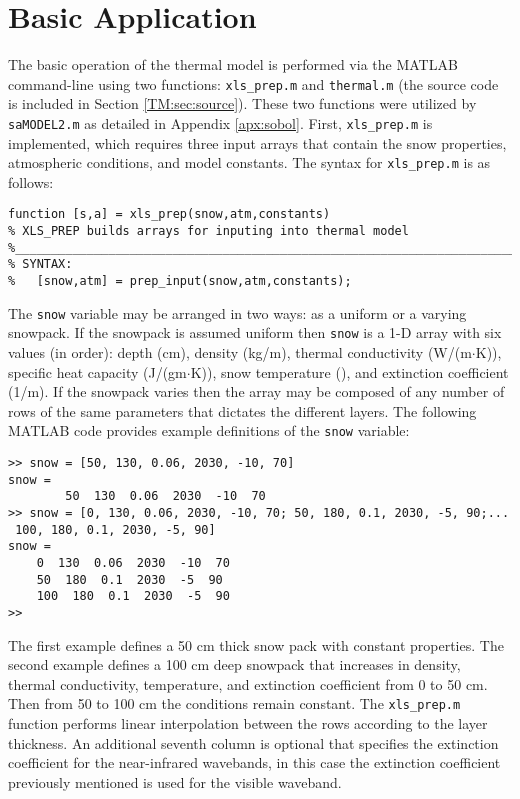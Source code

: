 \section{Basic Application}\label{TM:sec:basic}
The basic operation of the thermal model is performed via the MATLAB command-line using two functions: \texttt{xls\_prep.m} and \texttt{thermal.m} (the source code is included in Section \ref{TM:sec:source}).  These two functions were utilized by \texttt{saMODEL2.m} as detailed in Appendix \ref{apx:sobol}.  First, \texttt{xls\_prep.m} is implemented, which requires three input arrays that contain the snow properties, atmospheric conditions, and model constants.  The syntax for \texttt{xls\_prep.m} is as follows:

\begin{singlespaced}\begin{lstlisting}[style=inline]
function [s,a] = xls_prep(snow,atm,constants)
% XLS_PREP builds arrays for inputing into thermal model
%__________________________________________________________________________
% SYNTAX:
%   [snow,atm] = prep_input(snow,atm,constants);
\end{lstlisting}\end{singlespaced}

The \texttt{snow} variable may be arranged in two ways: as a uniform or a varying snowpack.  If the snowpack is assumed uniform then \texttt{snow} is a 1-D array with six values (in order): depth (cm), density (kg/m), thermal conductivity (W/(m$\cdot$K)), specific heat capacity (J/(gm$\cdot$K)), snow temperature (\C), and extinction coefficient (1/m).  If the snowpack varies then the array may be composed of any number of rows of the same parameters that dictates the different layers.  The following MATLAB code provides example definitions of the \texttt{snow} variable:
\begin{singlespaced}\begin{lstlisting}[style=inline]
>> snow = [50, 130, 0.06, 2030, -10, 70]
snow =
		50  130  0.06  2030  -10  70
>> snow = [0, 130, 0.06, 2030, -10, 70; 50, 180, 0.1, 2030, -5, 90;...
 100, 180, 0.1, 2030, -5, 90]
snow =
	0  130  0.06  2030  -10  70
	50  180  0.1  2030  -5  90
	100  180  0.1  2030  -5  90
>> 
\end{lstlisting}\end{singlespaced}

The first example defines a 50 cm thick snow pack with constant properties.  The second example defines a 100 cm deep snowpack that increases in density, thermal conductivity, temperature, and extinction coefficient from 0 to 50 cm.  Then from 50 to 100 cm the conditions remain constant.  The \texttt{xls\_prep.m} function performs linear interpolation between the rows according to the layer thickness.  An additional seventh column is optional that specifies the extinction coefficient for the near-infrared wavebands, in this case the extinction coefficient previously mentioned is used for the visible waveband.

